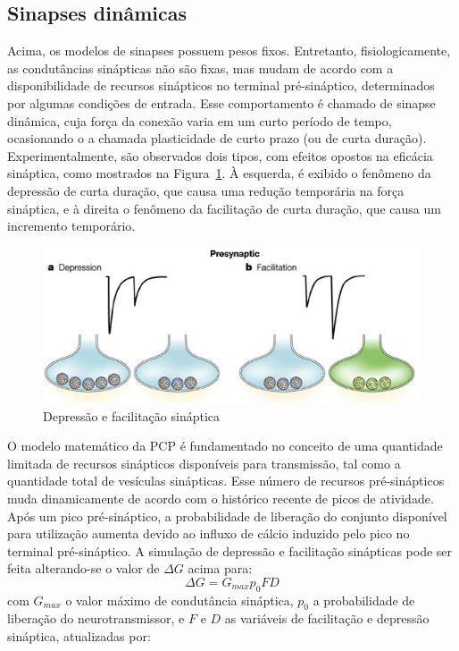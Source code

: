 \subsection{Sinapses dinâmicas}\label{subsec:sinapses_dinamicas}
Acima, os modelos de sinapses possuem pesos fixos. Entretanto, fisiologicamente, as condutâncias sinápticas não são fixas, mas mudam de acordo com a disponibilidade de recursos sinápticos no terminal pré-sináptico, determinados por algumas condições de entrada. Esse comportamento é chamado de sinapse dinâmica, cuja força da conexão varia em um curto período de tempo, ocasionando o a chamada plasticidade de curto prazo (ou de curta duração). Experimentalmente, são observados dois tipos, com efeitos opostos na eficácia sináptica, como mostrados na Figura~\ref{fig:plasticidadecurtaduracao}. À esquerda, é exibido o fenômeno da depressão de curta duração, que causa uma redução temporária na força sináptica, e à direita o fenômeno da facilitação de curta duração, que causa um incremento temporário.
\begin{figure}[tb]
	\centering
	\caption[Depressão e facilitação sináptica]{Depressão e facilitação sináptica}
	\label{fig:plasticidadecurtaduracao}
	\includegraphics[width=0.7\linewidth]{figs/plasticidade_curta_duracao}
\end{figure}
O modelo matemático da PCP é fundamentado no conceito de uma quantidade limitada de recursos sinápticos disponíveis para transmissão, tal como a quantidade total de vesículas sinápticas. Esse número de recursos pré-sinápticos muda dinamicamente de acordo com o histórico recente de picos de atividade. Após um pico pré-sináptico, a probabilidade de liberação do conjunto disponível para utilização aumenta devido ao influxo de cálcio induzido pelo pico no terminal pré-sináptico. A simulação de depressão e facilitação sinápticas pode ser feita alterando-se o valor de $\Delta G$ acima para:
\begin{equation}\label{eq:sinapse_facilitacao_depressao}
	\Delta G=G_{max}p_0FD
\end{equation}
com $G_{max}$ o valor máximo de condutância sináptica, $p_0$ a probabilidade de liberação do neurotransmissor, e $F$ e $D$ as variáveis de facilitação e depressão sináptica, atualizadas por:
